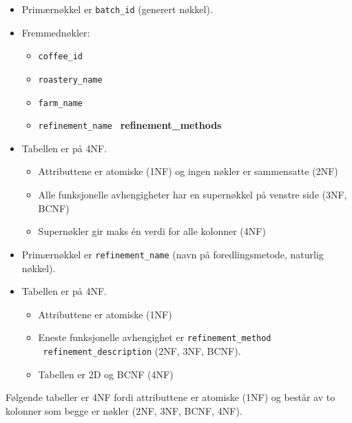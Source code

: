 
\begin{itemize}
    \item Primærnøkkel er \verb|batch_id| (generert nøkkel).
    \item Fremmednøkler:
    \begin{itemize}
        \item \verb|coffee_id| \rightarrow \ 
        \item \verb|roastery_name| \rightarrow \ 
        \item \verb|farm_name| \rightarrow \ 
        \item \verb|refinement_name| \rightarrow \ \textbf{\ttfamily refinement\_methods}
    \end{itemize}
    \pagebreak
    \item Tabellen er på 4NF.
    \begin{itemize}
        \item Attributtene er atomiske (1NF) og ingen nøkler er sammensatte (2NF)
        \item Alle funksjonelle avhengigheter har en supernøkkel på venstre side (3NF, BCNF)
        \item Supernøkler gir maks én verdi for alle kolonner (4NF)
    \end{itemize}
\end{itemize}

\vspace{0.5cm}


\begin{itemize}
    \item Primærnøkkel er \verb|refinement_name| (navn på foredlingsmetode, naturlig nøkkel).
    \item Tabellen er på 4NF.
    \begin{itemize}
        \item Attributtene er atomiske (1NF)
        \item Eneste funksjonelle avhengighet er \verb|refinement_method| \rightarrow \ \verb|refinement_description| (2NF, 3NF, BCNF).
        \item Tabellen er 2D og BCNF (4NF)
    \end{itemize}
\end{itemize}

\vspace{0.2cm}

Følgende tabeller er 4NF fordi attributtene er atomiske (1NF) og består av to kolonner som begge er nøkler (2NF, 3NF, BCNF, 4NF).

